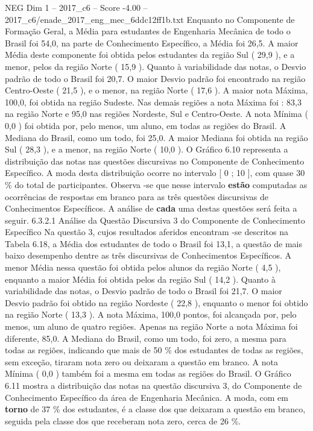 \begin{textsample}{NEG Dim 1 – 2017\_c6 – Score -4.00 – 2017\_c6/enade\_2017\_eng\_mec\_6ddc12ff1b.txt}
Enquanto no Componente de Formação Geral, a Média para estudantes de Engenharia Mecânica de todo o Brasil foi 54,0, na parte de Conhecimento Específico, a Média foi 26,5.
A maior Média deste componente foi obtida pelos estudantes da região Sul ( 29,9 ), e a menor, pelos da região Norte ( 15,9 ).
Quanto à variabilidade das notas, o Desvio padrão de todo o Brasil foi 20,7.
O maior Desvio padrão foi encontrado na região Centro-Oeste ( 21,5 ), e o menor, na região Norte ( 17,6 ).
A maior nota Máxima, 100,0, foi obtida na região Sudeste.
Nas demais regiões a nota Máxima foi : 83,3 na região Norte e 95,0 nas regiões Nordeste, Sul e Centro-Oeste.
A nota Mínima ( 0,0 ) foi obtida por, pelo menos, um aluno, em todas as regiões do Brasil.
A Mediana do Brasil, como um todo, foi 25,0.
A maior Mediana foi obtida na região Sul ( 28,3 ), e a menor, na região Norte ( 10,0 ).
O Gráfico 6.10 representa a distribuição das notas nas questões discursivas no Componente de Conhecimento Específico.
A moda desta distribuição ocorre no intervalo [ 0 ; 10 ], com quase 30 \% do total de participantes.
Observa -se que nesse intervalo \textbf{estão} computadas as ocorrências de respostas em branco para as três questões discursivas de Conhecimentos Específicos.
A análise de \textbf{cada} uma destas questões será feita a seguir. 6.3.2.1 Análise da Questão Discursiva 3 do Componente de Conhecimento Específico Na questão 3, cujos resultados aferidos encontram -se descritos na Tabela 6.18, a Média dos estudantes de todo o Brasil foi 13,1, a questão de mais baixo desempenho dentre as três discursivas de Conhecimentos Específicos.
A menor Média nessa questão foi obtida pelos alunos da região Norte ( 4,5 ), enquanto a maior Média foi obtida pelos da região Sul ( 14,2 ).
Quanto à variabilidade das notas, o Desvio padrão de todo o Brasil foi 21,7.
O maior Desvio padrão foi obtido na região Nordeste ( 22,8 ), enquanto o menor foi obtido na região Norte ( 13,3 ).
A nota Máxima, 100,0 pontos, foi alcançada por, pelo menos, um aluno de quatro regiões.
Apenas na região Norte a nota Máxima foi diferente, 85,0.
A Mediana do Brasil, como um todo, foi zero, a mesma para todas as regiões, indicando que mais de 50 \% dos estudantes de todas as regiões, sem exceção, tiraram nota zero ou deixaram a questão em branco.
A nota Mínima ( 0,0 ) também foi a mesma em todas as regiões do Brasil.
O Gráfico 6.11 mostra a distribuição das notas na questão discursiva 3, do Componente de Conhecimento Específico da área de Engenharia Mecânica.
A moda, com em \textbf{torno} de 37 \% dos estudantes, é a classe dos que deixaram a questão em branco, seguida pela classe dos que receberam nota zero, cerca de 26 \%.

\end{textsample}
